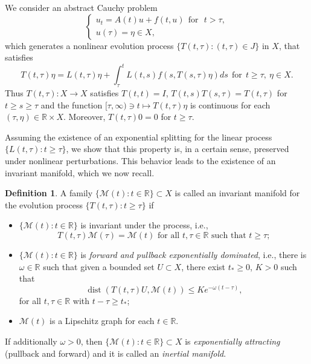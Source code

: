 \documentclass[a4paper,11pt,reqno]{amsart}
\theoremstyle{plain}
\theoremstyle{definition}
\newtheorem{defn}[lem]{Definition}
\numberwithin{equation}{section}
\newcommand{\R}{\mathbb{R}}
\newcommand{\calm}{\mathcal M}
\newcommand{\dist}{\operatorname{dist}}
\renewcommand{\geq}{\geqslant}
\renewcommand{\leq}{\leqslant}
\begin{document}
We consider an abstract Cauchy problem 
\begin{equation}\label{e:PERTURBED}
\begin{cases}
u_t=A(t)u+f(t,u)\ \ \textrm{for}\ \ \ t>\tau,\\
u(\tau)=\eta\in X,
\end{cases}
\end{equation}
which generates a nonlinear evolution process $\{T(t,\tau)\colon (t,\tau)\in J\}$ in $X$, that satisfies
\begin{equation}\label{e:VCF}
T(t,\tau)\eta=L(t,\tau)\eta+\int_{\tau}^{t}L(t,s)f(s,T(s,\tau)\eta)ds\ \ \text{for}\ \ t\geq\tau,\ \eta\in X.
\end{equation}
Thus $T(t,\tau)\colon X\to X$ satisfies $T(t,t)=I$, $T(t,s)T(s,\tau)=T(t,\tau)$ for $t\geq s\geq\tau$ and
the function $[\tau,\infty)\ni t\mapsto T(t,\tau)\eta$ is continuous for each $(\tau,\eta)\in\R\times X.$
Moreover, $T(t,\tau)0=0$ for $t\geq\tau$.


 Assuming the existence of an exponential splitting for the linear process $\{L(t,\tau)\colon t\geq \tau\}$, we show that this property is, in a certain sense, preserved under nonlinear perturbations. This behavior leads to the existence of an invariant manifold, which we now recall.
 
\begin{defn}\label{defn:INERTIAL}
	A family $\{\calm(t)\colon t\in\R\}\subset X$ is called an invariant manifold for the evolution process $\{T(t,\tau)\colon t\geq\tau\}$ if
	\begin{itemize}
		\item[(i)] $\{\calm(t)\colon t\in\R\}$ is invariant under the process, i.e., 
		$$T(t,\tau)\calm(\tau)=\calm(t)\text{ for all }t,\tau\in\R\text{ such that }t\geq\tau;$$
		\item[(ii)] $\{\mathcal{M}(t)\colon t\in \mathbb{R}\}$ is \textit{forward and pullback exponentially dominated}, i.e.,
		there is $\omega\in \mathbb{R}$ such that
given a bounded set $U\subset X$, there exist $t_*\geq 0$, $K>0$ such that 
$$\dist(T(t,\tau) U, \mathcal{M}(t))\leq Ke^{-\omega(t-\tau)},
$$ 
for all $t,\tau \in \R$ with  $t-\tau\geq t_*$;
		\item[(iii)] $\calm(t)$ is a Lipschitz graph for each $t\in\R$. 
	\end{itemize}
If additionally $\omega>0$, then $\{\mathcal{M}(t)\colon t\in \mathbb{R}\}\subset X$ is \textit{exponentially attracting} (pullback and forward) and it is called an {\emph{inertial manifold}.} 
\end{defn}
\end{document}
